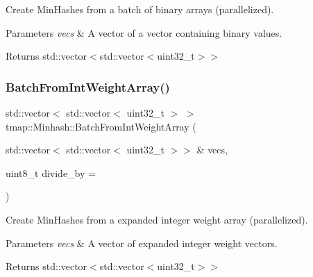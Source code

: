 Create Min\+Hashes from a batch of binary arrays (parallelized). 


\begin{DoxyParams}{Parameters}
{\em vecs} & A vector of a vector containing binary values. \\
\hline
\end{DoxyParams}
\begin{DoxyReturn}{Returns}
std\+::vector$<$std\+::vector$<$uint32\+\_\+t$>$$>$ 
\end{DoxyReturn}
\mbox{\label{classtmap_1_1Minhash_a1f2ae587c6b9e98be1cbdc7e9a81c2e7}} 
\subsubsection{\texorpdfstring{Batch\+From\+Int\+Weight\+Array()}{BatchFromIntWeightArray()}}
{\footnotesize\ttfamily std\+::vector$<$ std\+::vector$<$ uint32\+\_\+t $>$ $>$ tmap\+::\+Minhash\+::\+Batch\+From\+Int\+Weight\+Array (\begin{DoxyParamCaption}\item[{std\+::vector$<$ std\+::vector$<$ uint32\+\_\+t $>$$>$ \&}]{vecs,  }\item[{uint8\+\_\+t}]{divide\+\_\+by = {} }\end{DoxyParamCaption})}



Create Min\+Hashes from a expanded integer weight array (parallelized). 


\begin{DoxyParams}{Parameters}
{\em vecs} & A vector of expanded integer weight vectors. \\
\hline
\end{DoxyParams}
\begin{DoxyReturn}{Returns}
std\+::vector$<$std\+::vector$<$uint32\+\_\+t$>$$>$ 
\end{DoxyReturn}
\mbox{\label{classtmap_1_1Minhash_a490cf682e7445393fcf2908d74498ea5}} 
